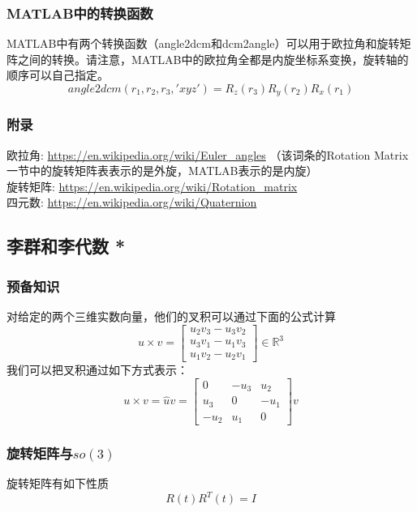 \documentclass{ctexart}
\begin{document}
	\subsubsection{MATLAB中的转换函数}
	MATLAB中有两个转换函数（angle2dcm和dcm2angle）可以用于欧拉角和旋转矩阵之间的转换。请注意，MATLAB中的欧拉角全都是内旋坐标系变换，旋转轴的顺序可以自己指定。
	\\\indent
	\begin{equation}
		angle2dcm(r_1,r_2,r_3,'xyz')=R_z(r_3) R_y(r_2) R_x(r_1)
	\end{equation}
	
	\subsubsection{附录}
	欧拉角: \url{https://en.wikipedia.org/wiki/Euler_angles}
	（该词条的Rotation Matrix一节中的旋转矩阵表表示的是外旋，MATLAB表示的是内旋）
	\\\indent
	旋转矩阵: \url{https://en.wikipedia.org/wiki/Rotation_matrix}
	\\\indent
	四元数: \url{https://en.wikipedia.org/wiki/Quaternion}
	
	
	\subsection{李群和李代数 *}
	\subsubsection{预备知识}
	对给定的两个三维实数向量，他们的叉积可以通过下面的公式计算
	\begin{equation}
	u \times v =
	\begin{bmatrix}
	u_2 v_3 - u_3 v_2 \\
	u_3 v_1 - u_1 v_3 \\
	u_1 v_2 - u_2 v_1
	\end{bmatrix}
	\in \mathbb{R}^3
	\end{equation}
	我们可以把叉积通过如下方式表示：
	\begin{equation}
	u \times v =
	\hat{u} v =
	\begin{bmatrix}
	0 & -u_3 & u_2 \\
	u_3 & 0 & -u_1 \\
	-u_2 & u_1 & 0
	\end{bmatrix}
	v
	\end{equation}
	\subsubsection{旋转矩阵与$so(3)$}
	旋转矩阵有如下性质
	\begin{equation}
	R(t) R^T(t) = I
	\end{equation}
	
\end{document}
